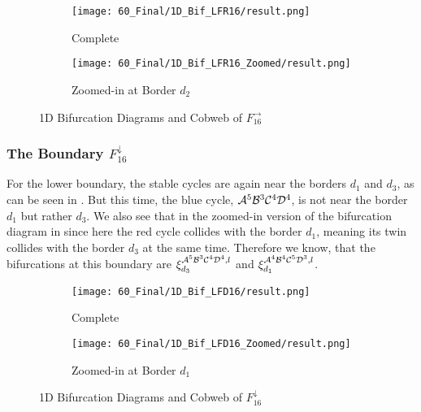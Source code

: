 \begin{figure}
    \centering
    \begin{subfigure}{0.4\textwidth}
        \centering
        \texttt{[image: 60\_Final/1D\_Bif\_LFR16/result.png]}
        \caption{Complete}
        \label{fig:final.bifurcation.F.right}
    \end{subfigure}
    \begin{subfigure}{0.4\textwidth}
        \centering
        \texttt{[image: 60\_Final/1D\_Bif\_LFR16\_Zoomed/result.png]}
        \caption{Zoomed-in at Border $d_2$}
        \label{fig:final.bifurcation.F.right.zoomed}
    \end{subfigure}
    \caption{1D Bifurcation Diagrams and Cobweb of $F_{16}^\rightarrow$}
\end{figure}

\subsubsection{The Boundary $F_{16}^\downarrow$}

For the lower boundary, the stable cycles are again near the borders $d_1$ and $d_3$, as can be seen in .
But this time, the blue cycle, $\mathcal{A}^5\mathcal{B}^3\mathcal{C}^4\mathcal{D}^4$, is not near the border $d_1$ but rather $d_3$.
We also see that in the zoomed-in version of the bifurcation diagram in  since here the red cycle collides with the border $d_1$, meaning its twin collides with the border $d_3$ at the same time.
Therefore we know, that the bifurcations at this boundary are $\xi_{d_3}^{\mathcal{A}^5\mathcal{B}^3\mathcal{C}^4\mathcal{D}^4, l}$ and $\xi_{d_1}^{\mathcal{A}^4\mathcal{B}^4\mathcal{C}^5\mathcal{D}^3, l}$.

\begin{figure}
    \centering
    \begin{subfigure}{0.4\textwidth}
        \centering
        \texttt{[image: 60\_Final/1D\_Bif\_LFD16/result.png]}
        \caption{Complete}
        \label{fig:final.bifurcation.F.down}
    \end{subfigure}
    \begin{subfigure}{0.4\textwidth}
        \centering
        \texttt{[image: 60\_Final/1D\_Bif\_LFD16\_Zoomed/result.png]}
        \caption{Zoomed-in at Border $d_1$}
        \label{fig:final.bifurcation.F.down.zoomed}
    \end{subfigure}
    \caption{1D Bifurcation Diagrams and Cobweb of $F_{16}^\downarrow$}
\end{figure}

